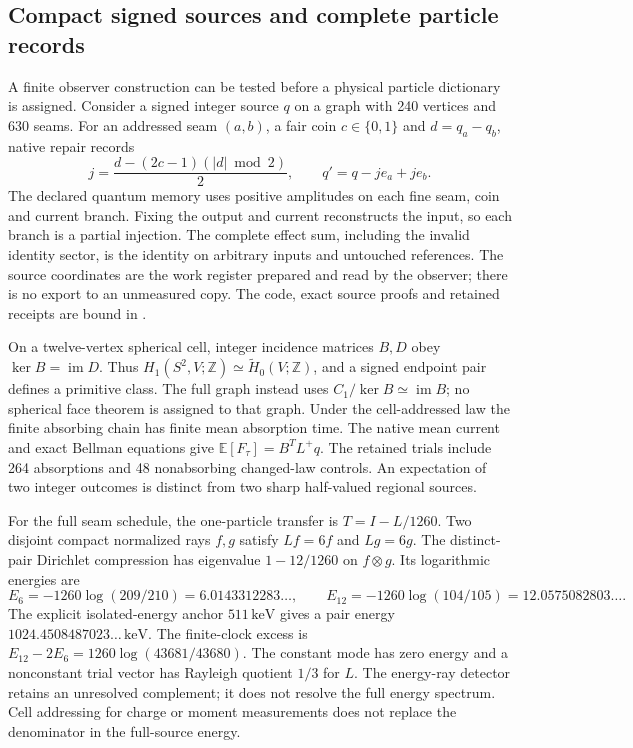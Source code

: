\subsection{Compact signed sources and complete particle records}
\label{subsec:signed-source-particle-records}

A finite observer construction can be tested before a physical particle
dictionary is assigned. Consider a signed integer source $q$ on a graph
with 240 vertices and 630 seams. For an addressed seam $(a,b)$, a fair
coin $c\in\{0,1\}$ and $d=q_a-q_b$, native repair records
\[
 j=\frac{d-(2c-1)(|d|\bmod 2)}2,
 \qquad q'=q-j e_a+j e_b.
\]
The declared quantum memory uses positive amplitudes on each fine
seam, coin and current branch. Fixing the output and current reconstructs
the input, so each branch is a partial injection. The complete effect sum,
including the invalid identity sector, is the identity on arbitrary inputs
and untouched references. The source coordinates are the work register
prepared and read by the observer; there is no export to an unmeasured copy.
The code, exact source proofs and retained receipts are bound in
.

On a twelve-vertex spherical cell, integer incidence matrices $B,D$ obey
$\ker B=\operatorname{im}D$. Thus
$H_1(S^2,V;\mathbb Z)\simeq\widetilde H_0(V;\mathbb Z)$, and a signed
endpoint pair defines a primitive class. The full graph instead uses
$C_1/\ker B\simeq\operatorname{im}B$; no spherical face theorem is
assigned to that graph. Under the cell-addressed law the finite absorbing
chain has finite mean absorption time. The native mean current and exact
Bellman equations give $\mathbb E[F_\tau]=B^T L^+q$. The retained trials
include 264 absorptions and 48 nonabsorbing changed-law controls.
An expectation of two integer outcomes is distinct from two sharp
half-valued regional sources.

For the full seam schedule, the one-particle transfer is
$T=I-L/1260$. Two disjoint compact normalized rays $f,g$ satisfy
$Lf=6f$ and $Lg=6g$. The distinct-pair Dirichlet compression has
eigenvalue $1-12/1260$ on $f\otimes g$. Its logarithmic energies are
\[
 E_6=-1260\log(209/210)=6.0143312283\ldots,\qquad
 E_{12}=-1260\log(104/105)=12.0575082803\ldots.
\]
The explicit isolated-energy anchor $511\,\mathrm{keV}$ gives a pair
energy $1024.4508487023\ldots\,\mathrm{keV}$. The finite-clock excess is
$E_{12}-2E_6=1260\log(43681/43680)$. The constant mode has zero energy
and a nonconstant trial vector has Rayleigh quotient $1/3$ for $L$.
The energy-ray detector retains an unresolved complement; it does not
resolve the full energy spectrum. Cell addressing for charge or moment
measurements does not replace the denominator in the full-source energy.

